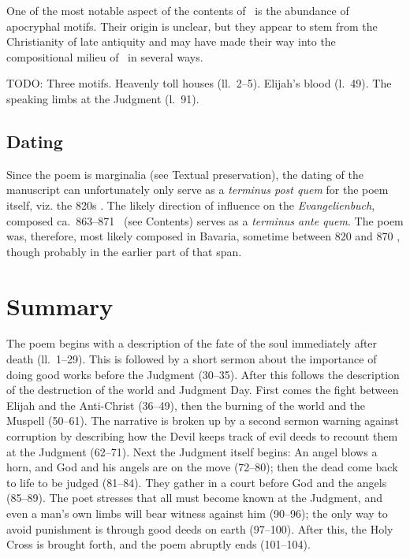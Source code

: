 One of the most notable aspect of the contents of \Muspilli\ is the abundance of apocryphal motifs.  Their origin is unclear, but they appear to stem from the Christianity of late antiquity and may have made their way into the compositional milieu of \Muspilli\ in several ways.

TODO: Three motifs.
Heavenly toll houses (ll.~2--5).
Elijah’s blood (l.~49).
The speaking limbs at the Judgment (l.~91).

\subsection{Dating}

Since the poem is marginalia (see Textual preservation), the dating of the manuscript can unfortunately only serve as a \emph{terminus post quem} for the poem itself, viz. the 820s \ce.  The likely direction of influence on the \emph{Evangelienbuch}, composed ca.~863--871 \ce\ (see Contents) serves as a \emph{terminus ante quem}.  The poem was, therefore, most likely composed in Bavaria, sometime between 820 and 870 \ce, though probably in the earlier part of that span.

\section{Summary}

The poem begins with a description of the fate of the soul immediately after death (ll.~1--29).  This is followed by a short sermon about the importance of doing good works before the Judgment (30--35).  After this follows the description of the destruction of the world and Judgment Day.  First comes the fight between Elijah and the Anti-Christ (36--49), then the burning of the world and the Muspell (50--61).  The narrative is broken up by a second sermon warning against corruption by describing how the Devil keeps track of evil deeds to recount them at the Judgment (62--71).  Next the Judgment itself begins: An angel blows a horn, and God and his angels are on the move (72--80); then the dead come back to life to be judged (81--84).  They gather in a court before God and the angels (85--89).  The poet stresses that all must become known at the Judgment, and even a man’s own limbs will bear witness against him (90--96); the only way to avoid punishment is through good deeds on earth (97--100).  After this, the Holy Cross is brought forth, and the poem abruptly ends (101--104).

\sectionline
\newpage

